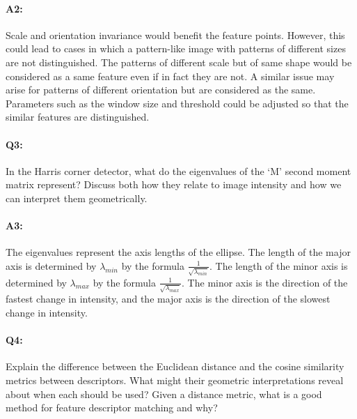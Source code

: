 \paragraph{A2:} Scale and orientation invariance would benefit the feature points. However, this could lead to cases in which a pattern-like image with patterns of different sizes are not distinguished. The patterns of different scale but of same shape would be considered as a same feature even if in fact they are not. A similar issue may arise for patterns of different orientation but are considered as the same. Parameters such as the window size and threshold could be adjusted so that the similar features are distinguished.




\pagebreak
\paragraph{Q3:} In the Harris corner detector, what do the eigenvalues of the `M' second moment matrix represent? Discuss both how they relate to image intensity and how we can interpret them geometrically.

\paragraph{A3:} The eigenvalues represent the axis lengths of the ellipse. The length of the major axis is determined by $\lambda_{min}$ by the formula $\frac{1}{\sqrt{\lambda_{min}}}$. The length of the minor axis is determined by $\lambda_{max}$ by the formula $\frac{1}{\sqrt{\lambda_{max}}}$. The minor axis is the direction of the fastest change in intensity, and the major axis is the direction of the slowest change in intensity.





\pagebreak
\paragraph{Q4:} Explain the difference between the Euclidean distance and the cosine similarity metrics between descriptors. What might their geometric interpretations reveal about when each should be used? Given a distance metric, what is a good method for feature descriptor matching and why?

